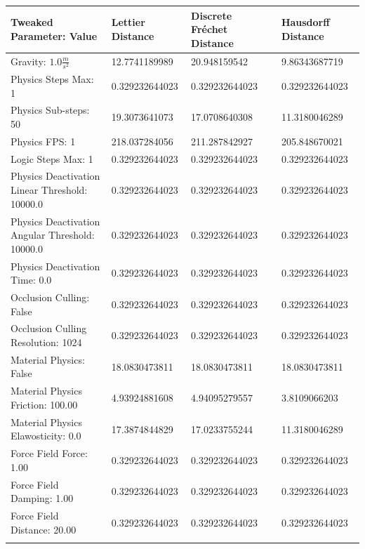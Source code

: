 \begin{table}[htbp]
\centering
\footnotesize
\def\arraystretch{1.1}
\begin{tabular}{ | l || l | l | l | }
\hline
\rowcolor{gray}
Tweaked Parameter: Value & Lettier Distance & Discrete Fr{\'e}chet Distance & Hausdorff Distance \\ \hline
Gravity: $1.0\frac{m}{s^2}$ & 12.7741189989 & 20.948159542 & 9.86343687719 \\ \hline
\rowcolor{cyan}
Physics Steps Max: 1 & 0.329232644023 & 0.329232644023 & 0.329232644023 \\ \hline
Physics Sub-steps: 50 & 19.3073641073 & 17.0708640308 & 11.3180046289 \\ \hline
Physics FPS: 1 & 218.037284056 & 211.287842927 & 205.848670021 \\ \hline
\rowcolor{cyan}
Logic Steps Max: 1 & 0.329232644023 & 0.329232644023 & 0.329232644023 \\ \hline
\rowcolor{cyan}
Physics Deactivation Linear Threshold: 10000.0 & 0.329232644023 & 0.329232644023 & 0.329232644023 \\ \hline
\rowcolor{cyan}
Physics Deactivation Angular Threshold: 10000.0 & 0.329232644023 & 0.329232644023 & 0.329232644023 \\ \hline
\rowcolor{cyan}
Physics Deactivation Time: 0.0 & 0.329232644023 & 0.329232644023 & 0.329232644023 \\ \hline
\rowcolor{cyan}
Occlusion Culling: False & 0.329232644023 & 0.329232644023 & 0.329232644023 \\ \hline
\rowcolor{cyan}
Occlusion Culling Resolution: 1024 & 0.329232644023  & 0.329232644023  & 0.329232644023 \\ \hline
Material Physics: False & 18.0830473811 & 18.0830473811  & 18.0830473811 \\ \hline
Material Physics Friction: 100.00 & 4.93924881608  & 4.94095279557  & 3.8109066203 \\ \hline
Material Physics Elawosticity: 0.0 & 17.3874844829  & 17.0233755244  & 11.3180046289 \\ \hline
\rowcolor{cyan}
Force Field Force: 1.00 & 0.329232644023  & 0.329232644023  & 0.329232644023 \\ \hline
\rowcolor{cyan}
Force Field Damping: 1.00 & 0.329232644023  & 0.329232644023  & 0.329232644023 \\ \hline
\rowcolor{cyan}
Force Field Distance: 20.00 & 0.329232644023  & 0.329232644023  & 0.329232644023 \\ \hline
\rowcolor{cyan}

\end{tabular}
\end{table}
